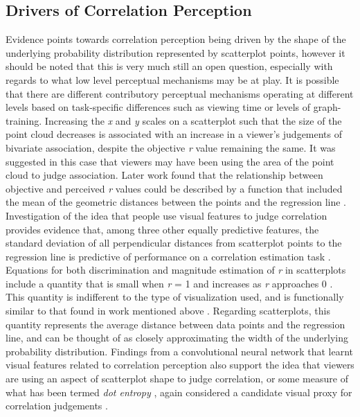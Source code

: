 \documentclass[manuscript, review, anonymous, screen]{acmart}
\begin{document}
\hypertarget{sec-drivers}{%
\subsection{Drivers of Correlation Perception}\label{sec-drivers}}

Evidence points towards correlation perception being driven by the shape
of the underlying probability distribution represented by scatterplot
points, however it should be noted that this is very much still an open
question, especially with regards to what low level perceptual
mechanisms may be at play. It is possible that there are different
contributory perceptual mechanisms operating at different levels based
on task-specific differences such as viewing time or levels of
graph-training. Increasing the \emph{x} and \emph{y} scales on a
scatterplot such that the size of the point cloud decreases
\citep{cleveland_1982} is associated with an increase in a viewer's
judgements of bivariate association, despite the objective \emph{r}
value remaining the same. It was suggested in this case that viewers may
have been using the area of the point cloud to judge association. Later
work found that the relationship between objective and perceived
\emph{r} values could be described by a function that included the mean
of the geometric distances between the points and the regression line
\citep{meyer_1997}. Investigation of the idea that people use visual
features to judge correlation provides evidence that, among three other
equally predictive features, the standard deviation of all perpendicular
distances from scatterplot points to the regression line is predictive
of performance on a correlation estimation task \citep{yang_2019}.
Equations for both discrimination and magnitude estimation of \emph{r}
in scatterplots include a quantity that is small when \emph{r} = 1 and
increases as \emph{r} approaches 0 \citep{rensink_2017}. This quantity
is indifferent to the type of visualization used, and is functionally
similar to that found in work mentioned above
\citep{cleveland_1982, meyer_1997, yang_2019}. Regarding scatterplots,
this quantity represents the average distance between data points and
the regression line, and can be thought of as closely approximating the
width of the underlying probability distribution. Findings from a
convolutional neural network that learnt visual features related to
correlation perception also support the idea that viewers are using an
aspect of scatterplot shape to judge correlation, or some measure of
what has been termed \emph{dot entropy} \citep{yang_2023}, again
considered a candidate visual proxy for correlation judgements
\citep{rensink_2017, rensink_2022}.
\end{document}
